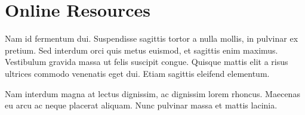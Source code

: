 \documentclass[sigconf]{acmart}
\begin{document}
\section{Online Resources}

Nam id fermentum dui. Suspendisse sagittis tortor a nulla mollis, in
pulvinar ex pretium. Sed interdum orci quis metus euismod, et sagittis
enim maximus. Vestibulum gravida massa ut felis suscipit
congue. Quisque mattis elit a risus ultrices commodo venenatis eget
dui. Etiam sagittis eleifend elementum.

Nam interdum magna at lectus dignissim, ac dignissim lorem
rhoncus. Maecenas eu arcu ac neque placerat aliquam. Nunc pulvinar
massa et mattis lacinia.
\end{document}
